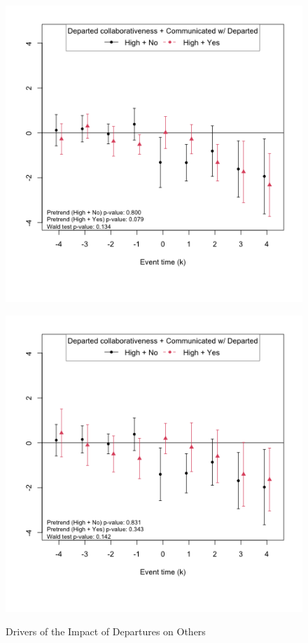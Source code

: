 \begin{figure}[htbp]
    \caption{Drivers of the Impact of Departures on Others }
    \label{fig:prs_opened_comm_int_marg_avg}
    \centering
    \begin{minipage}[b]{0.48\textwidth}
        \centering
         \label{fig:predep_prs_opened_high_collab_comm_inv0_rep}
        \includegraphics[width=\textwidth]{temp/output/collab_imp/inv0_cs_norm_prs_opened_dept_never_comm_predep_High.png}
    \end{minipage}
    \hfill
    \begin{minipage}[b]{0.48\textwidth}
        \centering
         \label{fig:predep_n_avg_prs_opened_high_collab_comm_inv0}
        \includegraphics[width=\textwidth]{temp/output/collab_imp/inv0_cs_norm_n_avg_prs_opened_dept_never_comm_predep_High.png}

\end{minipage}
\end{figure}

